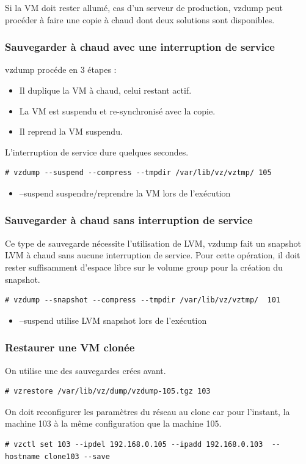 \documentclass[a4paper,11pt]{report}
\begin{document}
Si la VM doit rester allumé, cas d'un serveur de production, vzdump peut procéder à faire une copie à chaud dont deux solutions sont disponibles.


\subsubsection{Sauvegarder à chaud avec une interruption de service}

vzdump procéde en 3 étapes :
\begin{itemize} 
   \item Il duplique la VM à chaud, celui restant actif.
   \item La VM est suspendu et re-synchronisé avec la copie.
   \item Il reprend la VM suspendu.
\end{itemize}
L'interruption de service dure quelques secondes.

\begin{lstlisting}
# vzdump --suspend --compress --tmpdir /var/lib/vz/vztmp/ 105
\end{lstlisting}
\begin{itemize} 
   \item --suspend suspendre/reprendre la VM lors de l'exécution
\end{itemize}
   

\subsubsection{Sauvegarder à chaud sans interruption de service}

Ce type de sauvegarde nécessite l'utilisation de LVM, vzdump fait un snapshot LVM à chaud sans aucune interruption de service.
Pour cette opération, il doit rester suffisamment d'espace libre sur le volume group pour la création du snapshot.

\begin{lstlisting}
# vzdump --snapshot --compress --tmpdir /var/lib/vz/vztmp/  101
\end{lstlisting}
\begin{itemize} 
   \item --suspend utilise LVM snapshot lors de l'exécution
\end{itemize}

\subsubsection{Restaurer une VM clonée}

On utilise une des sauvegardes crées avant.
\begin{lstlisting}
# vzrestore /var/lib/vz/dump/vzdump-105.tgz 103
\end{lstlisting}

On doit reconfigurer les paramètres du réseau au clone car pour l'instant, la machine 103 à la même configuration que la machine 105. 
\begin{lstlisting}
# vzctl set 103 --ipdel 192.168.0.105 --ipadd 192.168.0.103  --hostname clone103 --save
\end{lstlisting}
\end{document}
